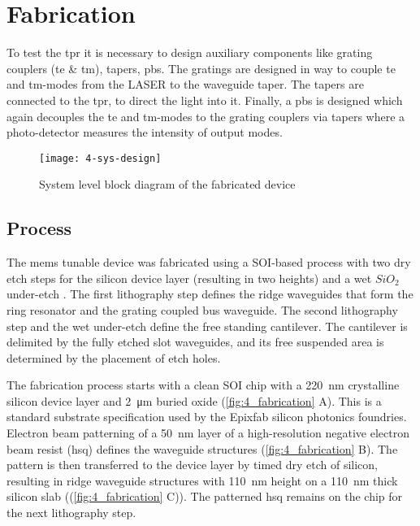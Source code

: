 \documentclass[../report.tex]{subfiles}
\begin{document}
	
	
\chapter{Fabrication}
To test the \gls{tpr} it is necessary to design auxiliary components like grating couplers (\gls{te} \& \gls{tm}), tapers, \gls{pbs}. The gratings are designed in way to couple \gls{te} and \gls{tm}-modes from the LASER to the waveguide taper. The tapers are connected to the \gls{tpr}, to direct the light into it. Finally, a \gls{pbs} is designed which again decouples the \gls{te} and \gls{tm}-modes to the grating couplers via tapers where a photo-detector measures the intensity of output modes.  

\begin{figure}[H] %
	\centering
	\texttt{[image: 4-sys-design]}
	\caption{System level block diagram of the fabricated device}
	\label{fig:4_sys_design}
\end{figure}

\section{Process}
The \gls{mems} tunable device was fabricated using a SOI-based process with two dry etch steps for the silicon device layer (resulting in two heights) and a wet $SiO_2$ under-etch \cite{errando-herranz_low-power_2015}. The first lithography step defines the ridge waveguides that form the ring resonator and the grating coupled bus waveguide.  The second lithography step and the wet under-etch define the free standing cantilever. The cantilever is delimited by the fully etched slot waveguides, and its free suspended area is determined by the placement of etch holes.

\par The fabrication process starts with a clean SOI chip with a \SI{220}{\nano \meter} crystalline silicon device layer and \SI{2}{\micro \meter} buried oxide (\ref{fig:4_fabrication} A). This is a standard substrate specification used by the Epixfab silicon photonics foundries. Electron beam patterning of a \SI{50}{\nano \meter} layer of a high-resolution negative electron beam resist (\gls{hsq}) defines the waveguide structures (\ref{fig:4_fabrication} B). The pattern is then transferred to the device layer by timed dry etch of silicon, resulting in ridge waveguide structures with \SI{110}{\nano \meter} height on a \SI{110}{\nano \meter} thick silicon slab ((\ref{fig:4_fabrication} C)). The patterned \gls{hsq} remains on the chip for the next lithography step.
\end{document}
